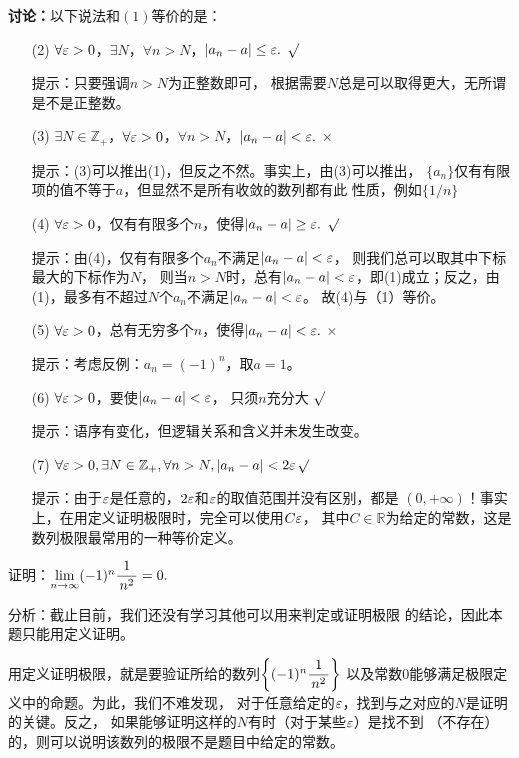 {\bf 讨论：}以下说法和$(1)$等价的是：
\begin{enumerate}
  \setlength{\itemindent}{1cm}
  \item[(2)] $\forall\varepsilon>0$，$\exists N$，$\forall
  n>N$，$|a_n-a|\leq\varepsilon.$ \hfill{$\surd$} 
  
  \ifhint\quad 提示：只要强调$n>N$为正整数即可，
  根据需要$N$总是可以取得更大，无所谓是不是正整数。\fi

  \item[(3)] $\exists N\in\mathbb{Z}_+$，$\forall\varepsilon>0$，$\forall
  n>N$，$|a_n-a|<\varepsilon.$ \hfill{$\times$}
  
  \ifhint\quad 提示：(3)可以推出(1)，但反之不然。事实上，由(3)可以推出，
  $\{a_n\}$仅有有限项的值不等于$a$，但显然不是所有收敛的数列都有此
  性质，例如$\{1/n\}$\fi

  \item[(4)] $\forall\varepsilon>0$，仅有有限多个$n$，使得$|a_n-a|\geq\varepsilon.$
  \hfill{$\surd$}
  
  \ifhint\quad 提示：由(4)，仅有有限多个$a_n$不满足$|a_n-a|<\varepsilon$，
  则我们总可以取其中下标最大的下标作为$N$，
  则当$n>N$时，总有$|a_n-a|<\varepsilon$，即(1)成立；反之，由
  (1)，最多有不超过$N$个$a_n$不满足$|a_n-a|<\varepsilon$。
  故(4)与（1）等价。\fi
  
  \item[(5)] $\forall\varepsilon>0$，总有无穷多个$n$，使得$|a_n-a|<\varepsilon.$
  \hfill{$\times$} 
  
  \ifhint\quad 提示：考虑反例：$a_n=(-1)^n$，取$a=1$。\fi

  \item[(6)] $\forall\varepsilon>0$，要使$|a_n-a|<\varepsilon$，
  只须$n$充分大 \hfill{$\surd$}
  
  \ifhint\quad 提示：语序有变化，但逻辑关系和含义并未发生改变。\fi

  \item[(7)] $\forall\varepsilon>0,\exists N\in\mathbb{Z}_+,\forall
  n>N,|a_n-a|<2\varepsilon$\hfill{$\surd$}
  
  \ifhint\quad 提示：由于$\varepsilon$是任意的，$2\varepsilon$和$\varepsilon$的取值范围并没有区别，都是
  $(0,+\infty)$！事实上，在用定义证明极限时，完全可以使用$C\varepsilon$，
  其中$C\in\mathbb{R}$为给定的常数，这是数列极限最常用的一种等价定义。\fi
\end{enumerate}

\bs
\egz 证明：$\lim\limits_{n\to\infty}(-1)^n\displaystyle\frac{\,{1}\,}{\,{n^2}\,}=0.$

分析：截止目前，我们还没有学习其他可以用来判定或证明极限
的结论，因此本题只能用定义证明。

用定义证明极限，就是要验证所给的数列$\left\{(-1)^n\displaystyle\frac{\,{1}\,}{\,{n^2}\,}\right\}$
以及常数$0$能够满足极限定义中的命题。为此，我们不难发现，
对于任意给定的$\varepsilon$，找到与之对应的$N$是证明的关键。反之，
如果能够证明这样的$N$有时（对于某些$\varepsilon$）是找不到
（不存在）的，则可以说明该数列的极限不是题目中给定的常数。

